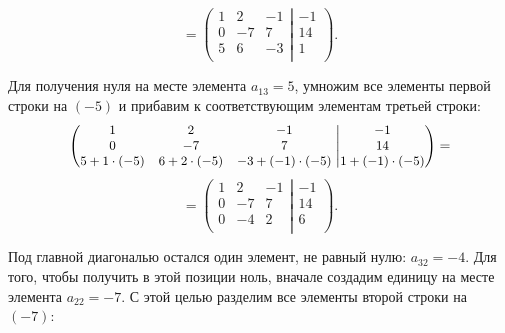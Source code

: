 \documentclass[10pt]{article}
\numberwithin{primer}{section}
\numberwithin{equation}{section}
\begin{document}
\begin{equation*}
=\left(\begin{matrix}
1 & 2 & -1 \\
0 & -7 & 7 \\
5 & 6 & -3 \\
\end{matrix}\right.\left|\begin{matrix}
-1 \\
14 \\
1 \\
\end{matrix}\right).
\end{equation*}

Для получения нуля на месте элемента $a_{13}=5$, умножим все элементы первой строки на $(-5)$ и прибавим к соответствующим
элементам третьей строки:
\begin{equation*}\small
\left(\begin{matrix}
1 & 2 & -1 \\
0 & -7 & 7 \\
5+1\cdot(-5) & 6+2\cdot(-5) & -3+(-1)\cdot(-5) \\
\end{matrix}\right.\left|\begin{matrix}
-1 \\
14 \\
1+(-1)\cdot(-5) \\
\end{matrix}\right)=
\end{equation*}
\begin{equation*}
=\left(\begin{matrix}
1 & 2 & -1 \\
0 & -7 & 7 \\
0 & -4 & 2 \\
\end{matrix}\right.\left|\begin{matrix}
-1 \\
14 \\
6 \\
\end{matrix}\right).
\end{equation*}

Под главной диагональю остался один элемент, не равный нулю: $a_{32}=-4$. Для того, чтобы получить в этой позиции ноль, вначале создадим единицу на
месте элемента $a_{22}=-7$. С этой целью разделим все элементы второй строки на $(-7)$:
\end{document}
